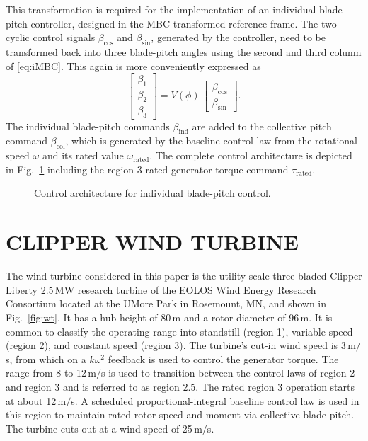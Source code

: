 \documentclass[times]{weauth}
\begin{document}
This transformation is required for the implementation of an individual blade-pitch controller,
designed in the MBC-transformed reference frame.
The two cyclic control signals $\beta_\text{cos}$ and $\beta_\text{sin}$,
generated by the controller, need to be
transformed back into three blade-pitch angles using the second and third
column of \eqref{eq:iMBC}. This again is more conveniently expressed as
\begin{equation}\label{eq:mbc_input}
\begin{bmatrix}
\beta_1 \\ \beta_2 \\ \beta_3
\end{bmatrix}
=
V(\phi)\,
\begin{bmatrix}
\beta_\text{cos} \\ \beta_\text{sin}
\end{bmatrix}.
\end{equation}
The individual blade-pitch commands $\beta_\text{ind}$ are added to the
collective pitch command $\beta_\text{col}$, which is generated by the baseline
control law from the rotational speed $\omega$ and its rated value $\omega_{\text{rated}}$.
The complete control architecture is depicted in Fig.~\ref{fig:architecture}
including the region 3 rated generator torque command  $\tau_{\text{rated}}$.


\begin{figure}[bt]
	\centering
	
	\caption{Control architecture for individual
		blade-pitch control.}
	\label{fig:architecture}	
\end{figure}


\section{CLIPPER WIND TURBINE}
The wind turbine considered in this paper is the
utility-scale three-bladed Clipper Liberty 2.5\,MW  research turbine of the
\mbox{EOLOS} Wind Energy Research Consortium located at the UMore Park in
Rosemount, MN, and shown in Fig.~\ref{fig:wt}.
It has a hub height of 80$\,$m and a rotor diameter of 96$\,$m.
It is common to classify the operating range into standstill (region 1),
variable speed (region 2), and constant speed (region 3).
The turbine's cut-in wind
speed is 3$\,$m$/$s, from which on a $k \omega^2$ feedback is used to
control the generator torque.
The range from 8 to 12$\,$m$/$s is used to transition between the
control laws of region 2 and region 3 and is referred to as region 2.5.
The rated region 3 operation starts at about 12$\,$m$/$s. A scheduled proportional-integral
baseline control law is used in this region to maintain rated rotor speed
and moment via collective blade-pitch. The turbine cuts out at a wind speed of 25$\,$m$/$s.
\end{document}
